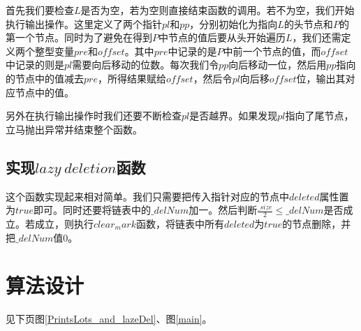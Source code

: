 \documentclass[UTF8]{ctexart}
\begin{document}
		\indent 首先我们要检查$L$是否为空，若为空则直接结束函数的调用。若不为空，我们开始执行输出操作。这里定义了两个指针$pl$和$pp$，分别初始化为指向$L$的头节点和$P$的第一个节点。同时为了避免在得到$P$中节点的值后要从头开始遍历$L$，我们还需定义两个整型变量$pre$和$offset$。其中$pre$中记录的是$P$中前一个节点的值，而$offset$中记录的则是$pl$需要向后移动的位数。每次我们令$pp$向后移动一位，然后用$pp$指向的节点中的值减去$pre$，所得结果赋给$offset$，然后令$pl$向后移$offset$位，输出其对应节点中的值。
		
		\indent 另外在执行输出操作时我们还要不断检查$pl$是否越界。如果发现$pl$指向了尾节点，立马抛出异常并结束整个函数。
		\subsection{实现$lazy\ deletion$函数}\label{lazy_del}
		\indent 这个函数实现起来相对简单。我们只需要把传入指针对应的节点中$deleted$属性置为$true$即可。同时还要将链表中的$\_delNum$加一。然后判断$\frac{\_size}{2} \leq \_delNum$是否成立。若成立，则执行$clear_mark$函数，将链表中所有$deleted$为$true$的节点删除，并把$\_delNum$值$0$。
	\section{算法设计}
	见下页图\ref{PrintsLots_and_lazeDel}、图\ref{main}。
\end{document}
